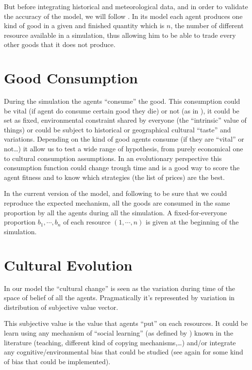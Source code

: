 \documentclass{wscpaperproc}
\begin{document}
But before integrating historical and meteorological data, and in order to validate the accuracy of the model, we will follow \cite{gintis_emergence_2006}. In its model each agent produces one kind of good in a given and finished quantity which is $n$, the number of different resource available in a simulation, thus allowing him to be able to trade every other goods that it does not produce.

\section{Good Consumption}
\label{consumption}



During the simulation the agents ``consume'' the good. This consumption could be vital (if agent do consume certain good they die) or not (as in \cite{macmillan_agent-based_2008}), it could be set as fixed, environmental constraint shared by everyone (the ``intrinsic'' value of things) or could be subject to historical or geographical cultural ``taste'' and variations. Depending on the kind of good agents consume (if they are ``vital'' or not\ldots) it allow us to test a wide range of hypothesis, from purely economical one to cultural consumption assumptions.  In an evolutionary perspective this consumption function could change trough time and is a good way to score the agent fitness and to know which strategies (the list of prices) are the best.

In the current version of the model, and following
\cite{gintis_emergence_2006} to be sure that we could reproduce the expected mechanism, all the goods are consumed in the same proportion by all the agents during all the simulation. A fixed-for-everyone proportion $b_1,\cdots,b_n$ of each resource $(1, \cdots, n)$ is given at the beginning of the simulation.

\section{Cultural Evolution}
In our model the ``cultural change'' is seen as the variation during time of the space of belief of all the agents. Pragmatically it's represented by variation in distribution of subjective value vector.

This subjective value is the value that agents ``put'' on each resources. It could be learn using any mechanism of ``social learning'' (as defined by \cite{lycett_cultural_2015}) known in the literature (teaching, different kind of copying mechanisms,\ldots) and/or integrate any cognitive/environmental bias that could be studied (see again \cite{lycett_cultural_2015} for some kind of bias that could be implemented).
\end{document}
